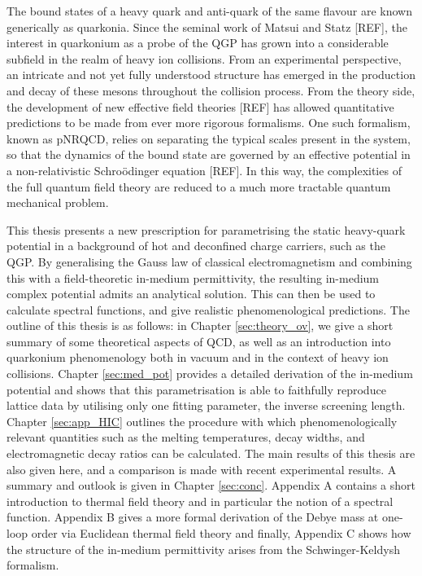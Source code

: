 \documentclass[12pt, a4paper, twoside]{book}
\begin{document}
The bound states of a heavy quark and anti-quark of the same flavour are known generically as quarkonia. Since the seminal work of Matsui and Statz [REF], the interest in quarkonium as a probe of the QGP has grown into a considerable subfield in the realm of heavy ion collisions. From an experimental perspective, an intricate and not yet fully understood structure has emerged in the production and decay of these mesons throughout the collision process. From the theory side, the development of new effective field theories [REF] has allowed quantitative predictions to be made from ever more rigorous formalisms. One such formalism, known as pNRQCD, relies on separating the typical scales present in the system, so that the dynamics of the bound state are governed by an effective potential in a non-relativistic Schro{\"o}dinger equation [REF]. In this way, the complexities of the full quantum field theory are reduced to a much more tractable quantum mechanical problem.

This thesis presents a new prescription for parametrising the static heavy-quark potential in a background of hot and deconfined charge carriers, such as the QGP. By generalising the Gauss law of classical electromagnetism and combining this with a field-theoretic in-medium permittivity, the resulting in-medium complex potential admits an analytical solution. This can then be used to calculate spectral functions, and give realistic phenomenological predictions. The outline of this thesis is as follows: in Chapter \ref{sec:theory_ov}, we give a short summary of some theoretical aspects of QCD, as well as an introduction into quarkonium phenomenology both in vacuum and in the context of heavy ion collisions. Chapter \ref{sec:med_pot} provides a detailed derivation of the in-medium potential and shows that this parametrisation is able to faithfully reproduce lattice data by utilising only one fitting parameter, the inverse screening length. Chapter \ref{sec:app_HIC} outlines the procedure with which phenomenologically relevant quantities such as the melting temperatures, decay widths, and electromagnetic decay ratios can be calculated. The main results of this thesis are also given here, and a comparison is made with recent experimental results. A summary and outlook is given in Chapter \ref{sec:conc}. Appendix A contains a short introduction to thermal field theory and in particular the notion of a spectral function. Appendix B gives a more formal derivation of the Debye mass at one-loop order via Euclidean thermal field theory and finally, Appendix C shows how the structure of the in-medium permittivity arises from the Schwinger-Keldysh formalism. 
\end{document}
